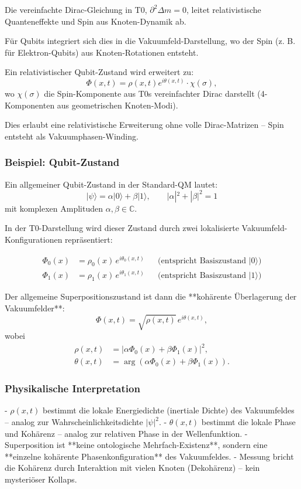 	Die vereinfachte Dirac-Gleichung in T0, $\partial^2 \Delta m = 0$, leitet relativistische Quanteneffekte und Spin aus Knoten-Dynamik ab.
	
	Für Qubits integriert sich dies in die Vakuumfeld-Darstellung, wo der Spin (z. B. für Elektron-Qubits) aus Knoten-Rotationen entsteht.
	
	Ein relativistischer Qubit-Zustand wird erweitert zu:
	\[
	\Phi(x,t) = \rho(x,t) e^{i\theta(x,t)} \cdot \chi(\sigma),
	\]
	wo $\chi(\sigma)$ die Spin-Komponente aus T0s vereinfachter Dirac darstellt (4-Komponenten aus geometrischen Knoten-Modi).
	
	Dies erlaubt eine relativistische Erweiterung ohne volle Dirac-Matrizen – Spin entsteht als Vakuumphasen-Winding.
	
	\subsubsection{Beispiel: Qubit-Zustand}
	
	Ein allgemeiner Qubit-Zustand in der Standard-QM lautet:
	\[
	|\psi\rangle = \alpha |0\rangle + \beta |1\rangle, \qquad |\alpha|^2 + |\beta|^2 = 1
	\]
	mit komplexen Amplituden $\alpha, \beta \in \mathbb{C}$.
	
	In der T0-Darstellung wird dieser Zustand durch zwei lokalisierte Vakuumfeld-Konfigurationen repräsentiert:
	
	\begin{align}
		\Phi_0(x) &= \rho_0(x) \, e^{i \theta_0(x,t)} && \text{(entspricht Basiszustand } |0\rangle\text{)} \\
		\Phi_1(x) &= \rho_1(x) \, e^{i \theta_1(x,t)} && \text{(entspricht Basiszustand } |1\rangle\text{)}
	\end{align}
	
	Der allgemeine Superpositionszustand ist dann die **kohärente Überlagerung der Vakuumfelder**:
	\[
	\Phi(x,t) = \sqrt{\rho(x,t)} \, e^{i \theta(x,t)},
	\]
	wobei
	\begin{align}
		\rho(x,t) &= |\alpha \Phi_0(x) + \beta \Phi_1(x)|^2, \\
		\theta(x,t) &= \arg(\alpha \Phi_0(x) + \beta \Phi_1(x)).
	\end{align}
	
	\subsubsection{Physikalische Interpretation}
	
	- $\rho(x,t)$ bestimmt die lokale Energiedichte (inertiale Dichte) des Vakuumfeldes – analog zur Wahrscheinlichkeitsdichte $|\psi|^2$.
	- $\theta(x,t)$ bestimmt die lokale Phase und Kohärenz – analog zur relativen Phase in der Wellenfunktion.
	- Superposition ist **keine ontologische Mehrfach-Existenz**, sondern eine **einzelne kohärente Phasenkonfiguration** des Vakuumfeldes.
	- Messung bricht die Kohärenz durch Interaktion mit vielen Knoten (Dekohärenz) – kein mysteriöser Kollaps.
	
